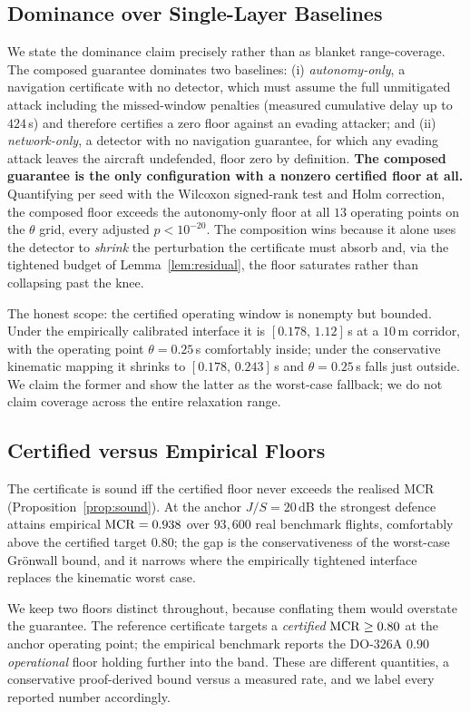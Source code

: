 \subsection{Dominance over Single-Layer Baselines}
We state the dominance claim precisely rather than as blanket range-coverage.
The composed guarantee dominates two baselines: (i) \emph{autonomy-only}, a
navigation certificate with no detector, which must assume the full unmitigated
attack including the missed-window penalties (measured cumulative delay up to
$424$\,s) and therefore certifies a zero floor against an evading attacker; and
(ii) \emph{network-only}, a detector with no navigation guarantee, for which
any evading attack leaves the aircraft undefended, floor zero by definition.
\textbf{The composed guarantee is the only configuration with a nonzero
certified floor at all.} Quantifying per seed with the Wilcoxon signed-rank test
and Holm correction, the composed floor exceeds the autonomy-only floor at all
$13$ operating points on the $\theta$ grid, every adjusted $p<10^{-20}$. The
composition wins because it alone uses the detector to \emph{shrink} the
perturbation the certificate must absorb and, via the tightened budget of
Lemma~\ref{lem:residual}, the floor saturates rather than collapsing past the
knee.

The honest scope: the certified operating window is nonempty but bounded. Under
the empirically calibrated interface it is $[0.178,\,1.12]$\,s at a $10$\,m
corridor, with the operating point $\theta=0.25$\,s comfortably inside; under
the conservative kinematic mapping it shrinks to $[0.178,\,0.243]$\,s and
$\theta=0.25$\,s falls just outside. We claim the former and show the latter as
the worst-case fallback; we do not claim coverage across the entire relaxation
range.

\subsection{Certified versus Empirical Floors}
The certificate is sound iff the certified floor never exceeds the realised MCR
(Proposition~\ref{prop:sound}). At the anchor $J/S=20$\,dB the strongest defence
attains empirical $\mathrm{MCR}=0.938$ over $93{,}600$ real benchmark flights,
comfortably above the certified target $0.80$; the gap is the conservativeness
of the worst-case Gr\"onwall bound, and it narrows where the empirically
tightened interface replaces the kinematic worst case.

We keep two floors distinct throughout, because conflating them would overstate
the guarantee. The reference certificate targets a \emph{certified}
$\mathrm{MCR}\ge0.80$ at the anchor operating point; the empirical benchmark reports the
DO-326A $0.90$ \emph{operational} floor holding further into the band. These are
different quantities, a conservative proof-derived bound versus a measured
rate, and we label every reported number accordingly.

